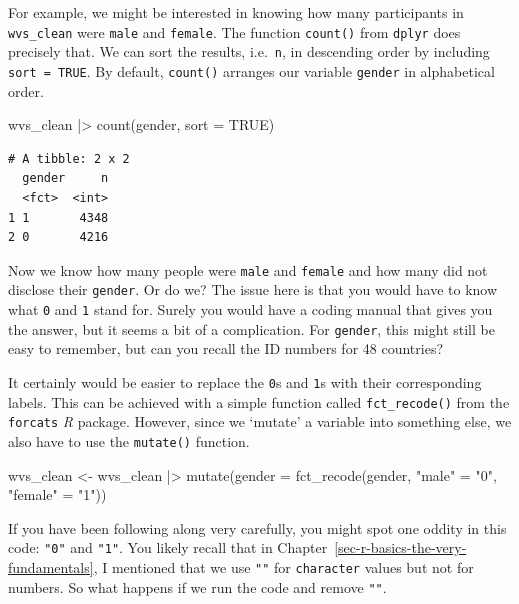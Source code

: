 \documentclass[
  letterpaper,
  DIV=11,
  numbers=noendperiod]{scrreprt}
\newenvironment{Shaded}{\begin{snugshade}}{\end{snugshade}}
\newcommand{\AttributeTok}[1]{\textcolor[rgb]{0.40,0.45,0.13}{#1}}
\newcommand{\ConstantTok}[1]{\textcolor[rgb]{0.56,0.35,0.01}{#1}}
\newcommand{\FunctionTok}[1]{\textcolor[rgb]{0.28,0.35,0.67}{#1}}
\newcommand{\NormalTok}[1]{\textcolor[rgb]{0.00,0.23,0.31}{#1}}
\newcommand{\OtherTok}[1]{\textcolor[rgb]{0.00,0.23,0.31}{#1}}
\newcommand{\SpecialCharTok}[1]{\textcolor[rgb]{0.37,0.37,0.37}{#1}}
\newcommand{\StringTok}[1]{\textcolor[rgb]{0.13,0.47,0.30}{#1}}
\begin{document}
For example, we might be interested in knowing how many participants in
\texttt{wvs\_clean} were \texttt{male} and \texttt{female}. The function
\texttt{count()} from \texttt{dplyr} does precisely that. We can sort
the results, i.e.~\texttt{n}, in descending order by including
\texttt{sort\ =\ TRUE}. By default, \texttt{count()} arranges our
variable \texttt{gender} in alphabetical order.

\begin{Shaded}
\begin{Highlighting}[]
\NormalTok{wvs\_clean }\SpecialCharTok{|\textgreater{}} \FunctionTok{count}\NormalTok{(gender, }\AttributeTok{sort =} \ConstantTok{TRUE}\NormalTok{)}
\end{Highlighting}
\end{Shaded}

\begin{verbatim}
# A tibble: 2 x 2
  gender     n
  <fct>  <int>
1 1       4348
2 0       4216
\end{verbatim}

Now we know how many people were \texttt{male} and \texttt{female} and
how many did not disclose their \texttt{gender}. Or do we? The issue
here is that you would have to know what \texttt{0} and \texttt{1} stand
for. Surely you would have a coding manual that gives you the answer,
but it seems a bit of a complication. For \texttt{gender}, this might
still be easy to remember, but can you recall the ID numbers for 48
countries?

It certainly would be easier to replace the \texttt{0}s and \texttt{1}s
with their corresponding labels. This can be achieved with a simple
function called \texttt{fct\_recode()} from the \texttt{forcats}
\emph{R} package. However, since we `mutate' a variable into something
else, we also have to use the \texttt{mutate()} function.

\begin{Shaded}
\begin{Highlighting}[]
\NormalTok{wvs\_clean }\OtherTok{\textless{}{-}}
\NormalTok{  wvs\_clean }\SpecialCharTok{|\textgreater{}}
  \FunctionTok{mutate}\NormalTok{(}\AttributeTok{gender =} \FunctionTok{fct\_recode}\NormalTok{(gender,}
                             \StringTok{"male"} \OtherTok{=} \StringTok{"0"}\NormalTok{,}
                             \StringTok{"female"} \OtherTok{=} \StringTok{"1"}\NormalTok{))}
\end{Highlighting}
\end{Shaded}

If you have been following along very carefully, you might spot one
oddity in this code: \texttt{"0"} and \texttt{"1"}. You likely recall
that in Chapter~\ref{sec-r-basics-the-very-fundamentals}, I mentioned
that we use \texttt{""} for \texttt{character} values but not for
numbers. So what happens if we run the code and remove \texttt{""}.
\end{document}
